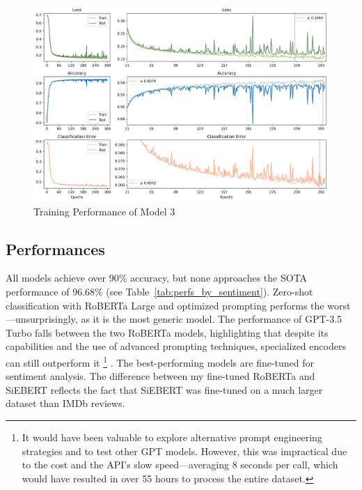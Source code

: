 \documentclass{article}
\begin{document}
\begin{figure}
  \centering
  \includegraphics[width=\textwidth]{figures/RoBERTa_learning_curves.png}
  \caption{Training Performance of Model 3}
  \label{fig:RoBERTa_learning_curves}
\end{figure}

\subsection{Performances}

All models achieve over 90\% accuracy, but none approaches the SOTA performance of 96.68\% (see Table~\ref{tab:perfs_by_sentiment}). Zero-shot classification with RoBERTa Large and optimized prompting performs the worst---unsurprisingly, as it is the most generic model. The performance of GPT-3.5 Turbo falls between the two RoBERTa models, highlighting that despite its capabilities and the use of advanced prompting techniques, specialized encoders can still outperform it 
\footnote{It would have been valuable to explore alternative prompt engineering strategies and to test other GPT models. However, this was impractical due to the cost and the API’s slow speed---averaging 8 seconds per call, which would have resulted in over 55 hours to process the entire dataset.}
. The best-performing models are fine-tuned for sentiment analysis. The difference between my fine-tuned RoBERTa and SiEBERT reflects the fact that SiEBERT was fine-tuned on a much larger dataset than IMDb reviews.
\end{document}

